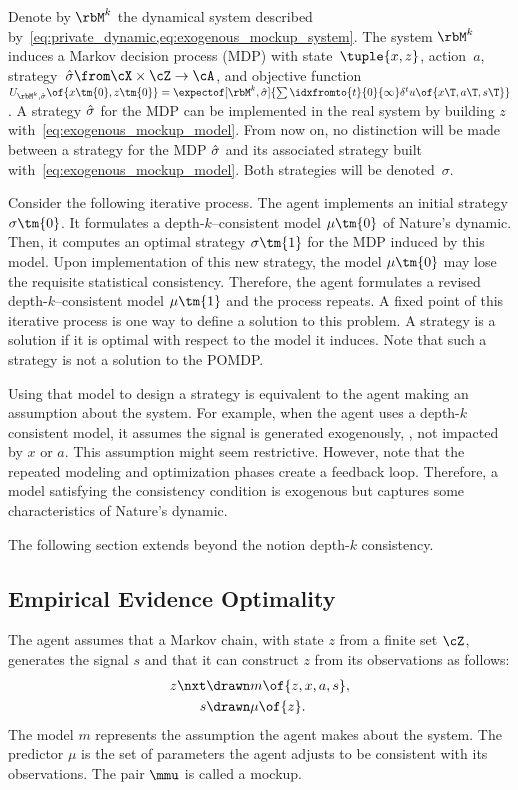 Denote by \(\rbM\K\) the dynamical system described by~\cref{eq:private_dynamic,eq:exogenous_mockup_system}.
The system \(\rbM\K\) induces a Markov decision process (MDP) with state~\(\tuple{x, z}\), action~\(a\), strategy~\(\sigmahat \from \cX \times \cZ \to \cA\), and objective function~\(U\params{\rbM\K, \sigmahat}\of{x\tm{0}, z\tm{0}} = \expectof[\rbM\K, \sigmahat]{\sum\idxfromto{t}{0}{\infty} \delta^t u \of{x\T, a\T, s\T}}\).
A strategy \(\hat{\sigma}\) for the MDP can be implemented in the real system by building \(z\) with~\cref{eq:exogenous_mockup_model}.
From now on, no distinction will be made between a strategy for the MDP \(\hat{\sigma}\) and its associated strategy built with~\cref{eq:exogenous_mockup_model}.
Both strategies will be denoted~\(\sigma\).

Consider the following iterative process.
The agent implements an initial strategy \(\sigma\tm{0}\).
It formulates a depth-\(k\)--consistent model \(\mu\tm{0}\) of Nature's dynamic.
Then, it computes an optimal strategy \(\sigma\tm{1}\) for the MDP induced by this model.
Upon implementation of this new strategy, the model \(\mu\tm{0}\) may lose the requisite statistical consistency.
Therefore, the agent formulates a revised depth-\(k\)--consistent model \(\mu\tm{1}\) and the process repeats.
A fixed point of this iterative process is one way to define a solution to this problem.
A strategy is a solution if it is optimal with respect to the model it induces.
Note that such a strategy is not a solution to the POMDP.

Using that model to design a strategy is equivalent to the agent making an assumption about the system.
For example, when the agent uses a depth-\(k\) consistent model, it assumes the signal is generated exogenously, \ie, not impacted by \(x\) or \(a\).
This assumption might seem restrictive.
However, note that the repeated modeling and optimization phases create a feedback loop.
Therefore, a model satisfying the consistency condition is exogenous but captures some characteristics of Nature's dynamic.

The following section extends beyond the notion depth-\(k\) consistency.

\subsection{Empirical Evidence Optimality}
\label{sec:empirical_evidence_optimality}

The agent assumes that a Markov chain, with state \(z\) from a finite set \(\cZ\), generates the signal \(s\) and that it can construct \(z\) from its observations as follows:
\begin{subequations}
\label{eq:mockup_system}
\begin{align}
\label{eq:mockup_model}
z\nxt &\drawn m \of{z, x, a, s}, \\
\label{eq:mockup_predictor}
s &\drawn \mu \of{z}.
\end{align}
\end{subequations}
The model \(m\) represents the assumption the agent makes about the system.
The predictor \(\mu\) is the set of parameters the agent adjusts to be consistent with its observations.
The pair \(\mmu\) is called a mockup.

